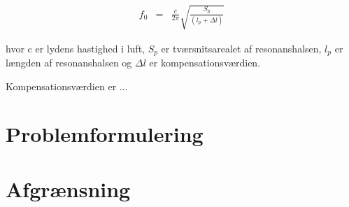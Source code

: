 \begin{eqnarray}
f_{0}&=&\frac{c}{2\pi}\sqrt{\frac{S_{p}}{\left(l_{p}+\Delta l\right)}}
\end{eqnarray}

hvor c er lydens hastighed i luft, $S_{p}$ er tværsnitsarealet af resonanshalsen, $l_{p}$ er længden af resonanshalsen og $\Delta l$ er kompensationsværdien. 

Kompensationsværdien er ...




\section{Problemformulering}

\section{Afgrænsning}
